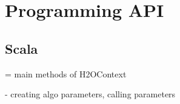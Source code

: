 \section{Programming API}

\subsection{Scala}
 = main methods of H2OContext

 - creating algo parameters, calling parameters





